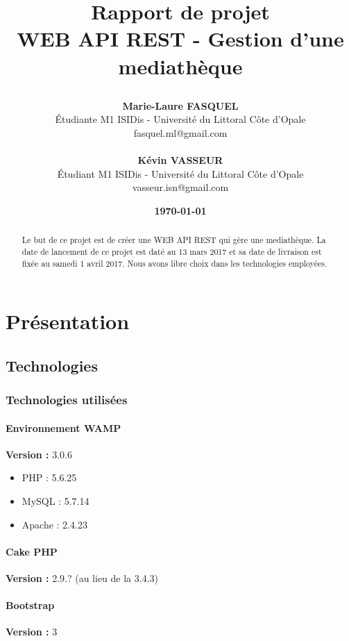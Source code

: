 \documentclass{report}
\title{%
    \begin{minipage}\linewidth
        \centering
        Rapport de projet\\
        \large WEB API REST - Gestion d'une mediath\`{e}que
    \end{minipage}
}
\author{
	\textbf{Marie-Laure FASQUEL} \\
	\'{E}tudiante M1 ISIDis - Universit\'{e} du Littoral C\^{o}te d'Opale\\
	fasquel.ml@gmail.com\\
	\\
	\textbf{K\'{e}vin VASSEUR} \\
	\'{E}tudiant M1 ISIDis - Universit\'{e} du Littoral C\^{o}te d'Opale\\
	vasseur.isn@gmail.com\\
}
\date{\textbf{\today}}
\begin{document}
	\maketitle
	\begin{abstract}
		Le but de ce projet est de cr\'{e}er une WEB API REST qui g\`{e}re une mediath\`{e}que. La date de lancement de ce projet est dat\'{e} au 13 mars 2017 et sa date de livraison est fix\'{e}e au samedi 1 avril 2017. Nous avons libre choix dans les technologies employ\'{e}es. \\
	\end{abstract}
	
	\tableofcontents	
	
	\chapter{Pr\'{e}sentation}
	
	
	\section{Technologies}
		\subsection{Technologies utilis\'{e}es}
			\subsubsection{Environnement WAMP}
			\textbf{Version :} 3.0.6 \\
			\begin{itemize}
			\item PHP : 5.6.25
			\item MySQL : 5.7.14
			\item Apache : 2.4.23
			\end{itemize}
			
			\subsubsection{Cake PHP}
			\textbf{Version :} 2.9.? (au lieu de la 3.4.3) \\
			
			\subsubsection{Bootstrap}
			\textbf{Version :} 3 \\		
			
\end{document}
